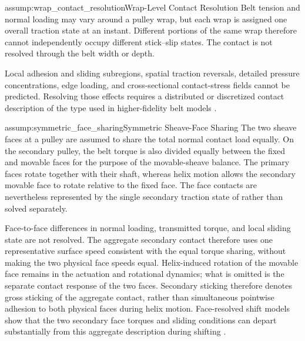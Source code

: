 \documentclass[11pt]{report}
\numberwithin{equation}{section}
\newcounter{assump}
\begin{document}
\begin{assumptionblock}{assump:wrap_contact_resolution}{Wrap-Level Contact Resolution}
Belt tension and normal loading may vary around a pulley wrap, but each wrap is
assigned one overall traction state at an instant. Different portions of the
same wrap therefore cannot independently occupy different stick--slip states.
The contact is not resolved through the belt width or depth.

\AssumptionConsequences
Local adhesion and sliding subregions, spatial traction reversals, detailed
pressure concentrations, edge loading, and cross-sectional contact-stress
fields cannot be predicted. Resolving those effects requires a distributed or
discretized contact description of the type used in higher-fidelity belt
models
\citep{KongParker2006,Messick2018,JulioPlante2011}.
\end{assumptionblock}

\begin{assumptionblock}{assump:symmetric_face_sharing}{Symmetric Sheave-Face Sharing}
The two sheave faces at a pulley are assumed to share the total normal contact
load equally. On the secondary pulley, the belt torque is also divided equally
between the fixed and movable faces for the purpose of the movable-sheave
balance. The primary faces rotate together with their shaft, whereas helix
motion allows the secondary movable face to rotate relative to the fixed face.
The face contacts are nevertheless represented by the single secondary
traction state of  rather than solved
separately.

\AssumptionConsequences
Face-to-face differences in normal loading, transmitted torque, and local
sliding state are not resolved. The aggregate secondary contact therefore uses
one representative surface speed consistent with the equal torque sharing,
without making the two physical face speeds equal. Helix-induced rotation of
the movable face remains in the actuation and rotational dynamics; what is
omitted is the separate contact response of the two faces. Secondary sticking
therefore denotes gross sticking of the aggregate contact, rather than
simultaneous pointwise adhesion to both physical faces during helix motion.
Face-resolved shift models show that the two secondary face torques and sliding
conditions can depart substantially from this aggregate description during
shifting \citep{SorgeCammalleri2011}.
\end{assumptionblock}


\end{document}
